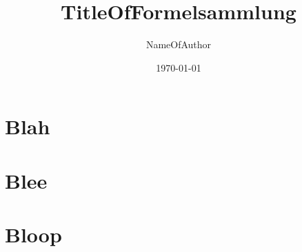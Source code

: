 

\newcommand{\FormelsammlungTitel}{TitleOfFormelsammlung}
\newcommand{\FormelsammlungAutor}{NameOfAuthor}
\setcounter{tocdepth}{2} %


	\title{\FormelsammlungTitel}
	\author{\FormelsammlungAutor}
	\date{\today}
	\begin{multicols*}{3}
			\maketitle
			\tableofcontents
		\section{Blah}
        \lipsum[1]
		\section{Blee}
        \lipsum[2]
		\section{Bloop}
        \lipsum[3]
	\end{multicols*}

